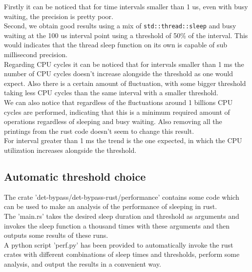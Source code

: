 \documentclass{article}
\begin{document}
Firstly it can be noticed that for time intervals smaller than 1 us, even with busy waiting, the precision is pretty poor.\\
Second, we obtain good results using a mix of \texttt{std::thread::sleep} and busy waiting at the 100 us interval point using a threshold of 50\% of the interval. This would indicates that the thread sleep function on its own is capable of sub millisecond precision.\\
Regarding CPU cycles it can be noticed that for intervals smaller than 1 ms the number of CPU cycles doesn't increase alongside the threshold as one would expect. Also there is a certain amount of fluctuation, with some bigger threshold taking less CPU cycles than the same interval with a smaller threshold.\\
We can also notice that regardless of the fluctuations around 1 billions CPU cycles are performed, indicating that this is a minimum required amount of operations regardless of sleeping and busy waiting. Also removing all the printings from the rust code doesn't seem to change this result.\\
For interval greater than 1 ms the trend is the one expected, in which the CPU utilization increases alongside the threshold.


\subsection*{Automatic threshold choice}
The crate 'det-bypass/det-bypass-rust/performance' contains some code which can be used to make an analysis of the performance of sleeping in rust.\\
The 'main.rs' takes the desired sleep duration and threshold as arguments and invokes the sleep function a thousand times with these arguments and then outputs some results of these runs.\\

A python script 'perf.py' has been provided to automatically invoke the rust crates with different combinations of sleep times and thresholds, perform some analysis, and output the results in a convenient way.\\
\end{document}
